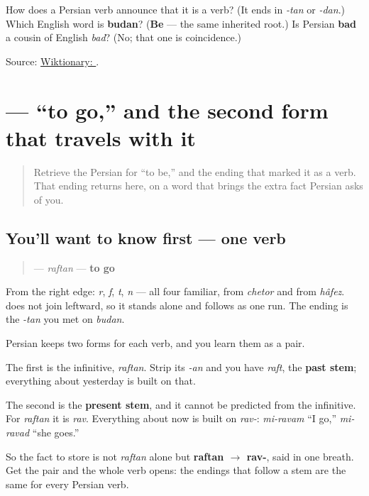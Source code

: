 \begin{tcolorbox}[breakable,colback=teal!4,colframe=teal!35!black,title={Before you move on}]
How does a Persian verb announce that it is a verb? (It ends in \emph{-tan} or \emph{-dan}.) Which English word is \textbf{budan}? (\textbf{Be} — the same inherited root.) Is Persian \textbf{bad} a cousin of English \emph{bad}? (No; that one is coincidence.)

Source: \href{https://en.wiktionary.org/wiki/\%D8\%A8\%D9\%88\%D8\%AF\%D9\%86}{Wiktionary: }.
\end{tcolorbox}
\section[\texorpdfstring{\fa{رفتن} (raftan)}{رفتن (raftan)}]{ — “to go,” and the second form that travels with it}

\label{lesson:FA-C06-raftan}



\begin{quote}
Retrieve the Persian for “to be,” and the ending that marked it as a verb. That ending returns here, on a word that brings the extra fact Persian asks of you.
\end{quote}

\subsection*{You'll want to know first — one verb}
\begin{quote}
\textbf{} — \emph{raftan} — \textbf{to go}
\end{quote}

From the right edge: \textbf{} \emph{r}, \textbf{} \emph{f}, \textbf{} \emph{t}, \textbf{} \emph{n} — all four familiar, \textbf{} from \emph{chetor} and \textbf{} from \emph{hâfez}. \textbf{} does not join leftward, so it stands alone and \textbf{} follows as one run. The ending is the \emph{-tan} you met on \emph{budan}.

\begin{grammarlens}[title={Grammar Lens: the second fact every Persian verb carries}]
Persian keeps two forms for each verb, and you learn them as a pair.

The first is the infinitive, \textbf{} \emph{raftan}. Strip its \emph{-an} and you have \textbf{} \emph{raft}, the \textbf{past stem}; everything about yesterday is built on that.

The second is the \textbf{present stem}, and it cannot be predicted from the infinitive. For \emph{raftan} it is \emph{rav}. Everything about now is built on \emph{rav-}: \emph{mi-ravam} “I go,” \emph{mi-ravad} “she goes.”

So the fact to store is not \emph{raftan} alone but \textbf{raftan $\to$ rav-}, said in one breath. Get the pair and the whole verb opens: the endings that follow a stem are the same for every Persian verb.
\end{grammarlens}

